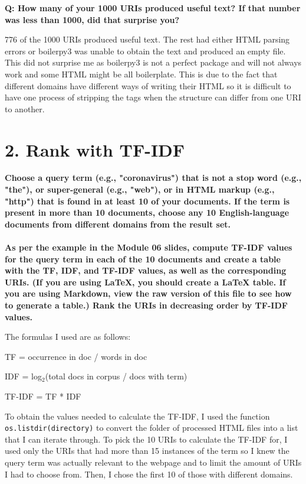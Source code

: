 \documentclass[12pt]{article}
\begin{document}
\noindent\textbf{Q: How many of your 1000 URIs produced useful text? If that number was less than 1000, did that surprise you?}

776 of the 1000 URIs produced useful text. The rest had either HTML parsing errors or boilerpy3 was unable to obtain the text and produced an empty file. This did not surprise me as boilerpy3 is not a perfect package and will not always work and some HTML might be all boilerplate. This is due to the fact that different domains have different ways of writing their HTML so it is difficult to have one process of stripping the tags when the structure can differ from one URI to another.

\section*{2. Rank with TF-IDF}
\noindent \textbf{Choose a query term (e.g., "coronavirus") that is not a stop word (e.g., "the"), or super-general (e.g., "web"), or in HTML markup (e.g., "http") that is found in at least 10 of your documents. If the term is present in more than 10 documents, choose any 10 English-language documents from different domains from the result set.\\
\\As per the example in the Module 06 slides, compute TF-IDF values for the query term in each of the 10 documents and create a table with the TF, IDF, and TF-IDF values, as well as the corresponding URIs. (If you are using LaTeX, you should create a LaTeX table. If you are using Markdown, view the raw version of this file to see how to generate a table.) Rank the URIs in decreasing order by TF-IDF values. }

The formulas I used are as follows: 

TF = occurrence in doc / words in doc 

IDF = log$_2$(total docs in corpus / docs with term)

TF-IDF = TF * IDF

To obtain the values needed to calculate the TF-IDF, I used the function \lstinline{os.listdir(directory)} to convert the folder of processed HTML files into a list that I can iterate through. To pick the 10 URIs to calculate the TF-IDF for, I used only the URIs that had more than 15 instances of the term so I knew the query term was actually relevant to the webpage and to limit the amount of URIs I had to choose from. Then, I chose the first 10 of those with different domains.
\end{document}
